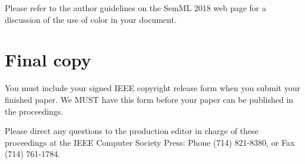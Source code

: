 \documentclass[10pt,twocolumn,letterpaper]{article}
\begin{document}
Please refer to the author guidelines on the SemML 2018 web page for a discussion
of the use of color in your document.

\section{Final copy}

You must include your signed IEEE copyright release form when you submit
your finished paper. We MUST have this form before your paper can be
published in the proceedings.

Please direct any questions to the production editor in charge of these
proceedings at the IEEE Computer Society Press: Phone (714) 821-8380, or
Fax (714) 761-1784.

{\small


}
\end{document}
